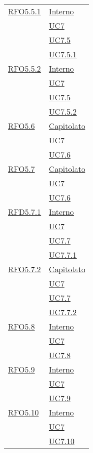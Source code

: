 \begin{longtable}{|>{\centering}m{5cm}|m{5cm}<{\centering}|}
\hyperlink{RFO5.5.1}{RFO5.5.1} 
& \hyperlink{Interno}{Interno}\\
& \hyperref[UC7]{UC7}\\
& \hyperref[UC7.5]{UC7.5}\\
& \hyperref[UC7.5.1]{UC7.5.1}\\ \hline

\hyperlink{RFO5.5.2}{RFO5.5.2} 
& \hyperlink{Interno}{Interno}\\
& \hyperref[UC7]{UC7}\\
& \hyperref[UC7.5]{UC7.5}\\
& \hyperref[UC7.5.2]{UC7.5.2}\\ \hline

\hyperlink{RFO5.6}{RFO5.6} 
& \hyperlink{Capitolato}{Capitolato}\\
& \hyperref[UC7]{UC7}\\
& \hyperref[UC7.6]{UC7.6}\\ \hline

\hyperlink{RFO5.7}{RFO5.7} 
& \hyperlink{Capitolato}{Capitolato}\\
& \hyperref[UC7]{UC7}\\
& \hyperref[UC7.6]{UC7.6}\\ \hline

\hyperlink{RFD5.7.1}{RFD5.7.1} 
& \hyperlink{Interno}{Interno}\\
& \hyperref[UC7]{UC7}\\
& \hyperref[UC7.7]{UC7.7}\\
& \hyperref[UC7.7.1]{UC7.7.1}\\ \hline

\hyperlink{RFO5.7.2}{RFO5.7.2} 
& \hyperlink{Capitolato}{Capitolato}\\
& \hyperref[UC7]{UC7}\\
& \hyperref[UC7.7]{UC7.7}\\
& \hyperref[UC7.7.2]{UC7.7.2}\\ \hline

\hyperlink{RFO5.8}{RFO5.8} 
& \hyperlink{Interno}{Interno}\\
& \hyperref[UC7]{UC7}\\
& \hyperref[UC7.8]{UC7.8}\\
 \hline
 
 \hyperlink{RFO5.9}{RFO5.9} 
 & \hyperlink{Interno}{Interno}\\
 & \hyperref[UC7]{UC7}\\
 & \hyperref[UC7.9]{UC7.9}\\\hline
 
\hyperlink{RFO5.10}{RFO5.10} 
& \hyperlink{Interno}{Interno}\\
 & \hyperref[UC7]{UC7}\\
 & \hyperref[UC7.10]{UC7.10}\\\hline
 

\end{longtable}
